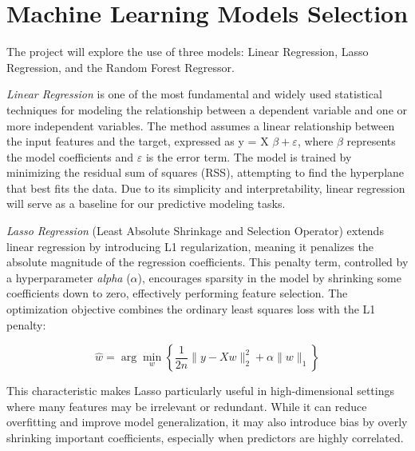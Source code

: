 \documentclass[12pt]{report} %
\begin{document}
\section{Machine Learning Models Selection}

The project will explore the use of three models: Linear Regression, Lasso Regression, and the Random Forest Regressor.

\textit{Linear Regression} \cite{linear_regression} is one of the most fundamental and widely used statistical techniques for modeling the relationship between a dependent variable and one or more independent variables. The method assumes a linear relationship between the input features and the target, expressed as y = X $\beta + \varepsilon $, where $\beta$ represents the model coefficients and $\varepsilon$ is the error term. The model is trained by minimizing the residual sum of squares (RSS), attempting to find the hyperplane that best fits the data. Due to its simplicity and interpretability, linear regression will serve as a baseline for our predictive modeling tasks.

\textit{Lasso Regression} \cite{lasso_regression} (Least Absolute Shrinkage and Selection Operator) extends linear regression by introducing L1 regularization, meaning it penalizes the absolute magnitude of the regression coefficients. This penalty term, controlled by a hyperparameter \textit{alpha} ($\alpha$), encourages sparsity in the model by shrinking some coefficients down to zero, effectively performing feature selection. The optimization objective combines the ordinary least squares loss with the L1 penalty:

\begin{equation*}
\hat{w} = \arg\min_{w} \left\{ \frac{1}{2n} \| y - Xw \|_2^2 + \alpha \| w \|_1 \right\}
\end{equation*}

This characteristic makes Lasso particularly useful in high-dimensional settings where many features may be irrelevant or redundant. While it can reduce overfitting and improve model generalization, it may also introduce bias by overly shrinking important coefficients, especially when predictors are highly correlated.
\end{document}
